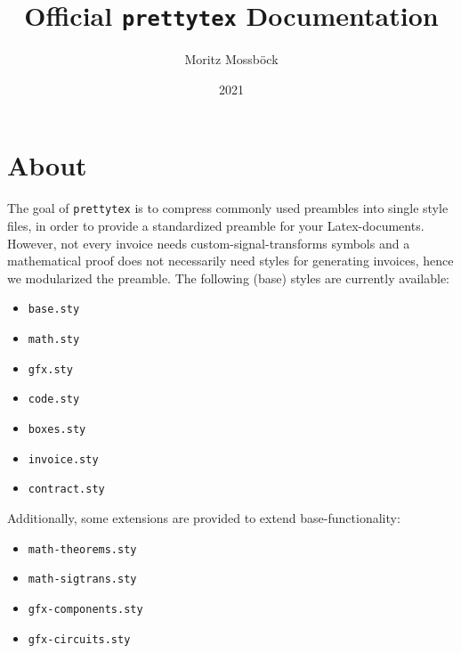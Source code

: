 \documentclass{article}
\author{Moritz Mossböck}
\date{2021}
\title{Official \texttt{prettytex} Documentation}
\newcommand{\prettytex}{\texttt{prettytex} }
\begin{document}
\maketitle
\tableofcontents
\newpage
{}

\section{About}
The goal of \prettytex is to compress commonly used preambles into single style files, in order to provide a 
standardized preamble for your Latex-documents. However, not every invoice needs custom-signal-transforms symbols
and a mathematical proof does not necessarily need styles for generating invoices, hence we modularized the 
preamble. The following (base) styles are currently available:
\begin{itemize}
  \item \texttt{base.sty}
  \item \texttt{math.sty}
  \item \texttt{gfx.sty}
  \item \texttt{code.sty}
  \item \texttt{boxes.sty}
  \item \texttt{invoice.sty}
  \item \texttt{contract.sty}
\end{itemize}

Additionally, some extensions are provided to extend base-functionality:
\begin{itemize}
  \item \texttt{math-theorems.sty}
  \item \texttt{math-sigtrans.sty}
  \item \texttt{gfx-components.sty}
  \item \texttt{gfx-circuits.sty}
\end{itemize}
\end{document}

